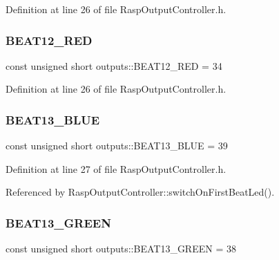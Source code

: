 Definition at line 26 of file Rasp\+Output\+Controller.\+h.

\mbox{\label{namespaceoutputs_a3138968cd14e309f1e88228bd1259f3f}} 
\subsubsection{\texorpdfstring{B\+E\+A\+T12\+\_\+\+R\+ED}{BEAT12\_RED}}
{\footnotesize\ttfamily const unsigned short outputs\+::\+B\+E\+A\+T12\+\_\+\+R\+ED = 34}



Definition at line 26 of file Rasp\+Output\+Controller.\+h.

\mbox{\label{namespaceoutputs_a38a0eba17cc5ed8eed42c37dca1feb3f}} 
\subsubsection{\texorpdfstring{B\+E\+A\+T13\+\_\+\+B\+L\+UE}{BEAT13\_BLUE}}
{\footnotesize\ttfamily const unsigned short outputs\+::\+B\+E\+A\+T13\+\_\+\+B\+L\+UE = 39}



Definition at line 27 of file Rasp\+Output\+Controller.\+h.



Referenced by Rasp\+Output\+Controller\+::switch\+On\+First\+Beat\+Led().

\mbox{\label{namespaceoutputs_a3410f51b9ac465ad73e71e8bd54b3ab4}} 
\subsubsection{\texorpdfstring{B\+E\+A\+T13\+\_\+\+G\+R\+E\+EN}{BEAT13\_GREEN}}
{\footnotesize\ttfamily const unsigned short outputs\+::\+B\+E\+A\+T13\+\_\+\+G\+R\+E\+EN = 38}



